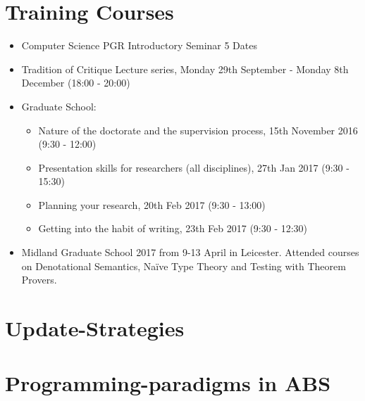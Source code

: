 \begin{appendices}

\chapter{Training Courses}
\begin{itemize}
\item Computer Science PGR Introductory Seminar 5 Dates
\item Tradition of Critique Lecture series, Monday 29th September - Monday 8th December (18:00 - 20:00)
\item Graduate School: 
	\begin{itemize}	
		\item Nature of the doctorate and the supervision process, 15th November 2016 (9:30 - 12:00)
		\item Presentation skills for researchers (all disciplines), 27th Jan 2017 (9:30 - 15:30)
		\item Planning your research, 20th Feb 2017 (9:30 - 13:00)
		\item Getting into the habit of writing, 23th Feb 2017 (9:30 - 12:30)
	\end{itemize}
\item Midland Graduate School 2017 from 9-13 April in Leicester. Attended courses on Denotational Semantics, Naïve Type Theory and Testing with Theorem Provers.
\end{itemize}

\chapter{Update-Strategies}
\label{app:updateStrategies}


\chapter{Programming-paradigms in ABS}
\label{app:paradigms}






\end{appendices}